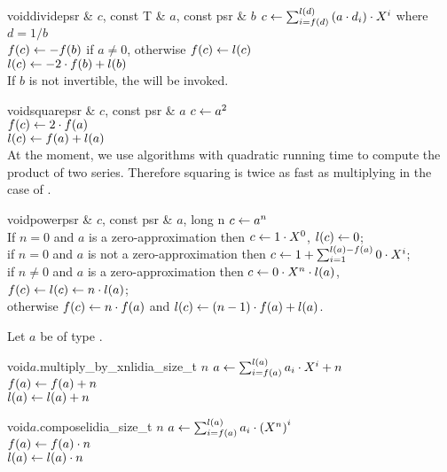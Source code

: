 \begin{fcode}{void}{divide}{psr & $c$, const T & $a$, const psr & $b$}
  $c \leftarrow \sum_{i=f(d)}^{l(d)} \left( a \cdot d_i \right) \cdot X^i$ where $d = 1/b $\\
  $f(c) \leftarrow - f(b)$ if $a \neq 0$, otherwise $f(c) \leftarrow l(c)$ \\
  $l(c) \leftarrow - 2 \cdot f(b) + l(b)$ \\
  If $b$ is not invertible, the \LEH will be invoked.
\end{fcode}

\begin{fcode}{void}{square}{psr & $c$, const psr & $a$}
  $c \leftarrow a^2$ \\
  $f(c) \leftarrow 2 \cdot f(a)$ \\
  $l(c) \leftarrow f(a) + l(a)$ \\
  At the moment, we use algorithms with quadratic running time to compute the product of two
  series.  Therefore squaring is twice as fast as multiplying in the case of
  .
\end{fcode}

\begin{fcode}{void}{power}{psr & $c$, const psr & $a$, long n}
  $c \leftarrow a^n$ \\
  If $n = 0$ and $a$ is a zero-approximation then
  $c \leftarrow 1 \cdot X^0$, $l(c) \leftarrow 0$; \\
  if $n = 0$ and $a$ is not a zero-approximation then
  $c \leftarrow 1 + \sum_{i=1}^{l(a)-f(a)} 0 \cdot X^i$; \\
  if $n \neq 0$ and $a$ is a zero-approximation then
  $c \leftarrow 0 \cdot X^n \cdot l(a)$, $f(c) \leftarrow l(c) \leftarrow n \cdot l(a)$; \\
  otherwise $f(c) \leftarrow n \cdot f(a)$ and $l(c) \leftarrow (n-1) \cdot f(a) + l(a)$.
\end{fcode}

Let $a$ be of type .

\begin{fcode}{void}{$a$.multiply_by_xn}{lidia_size_t $n$}
  $a \leftarrow \sum_{i=f(a)}^{l(a)} a_i \cdot X^i+n$ \\
  $f(a) \leftarrow f(a) + n$ \\
  $l(a) \leftarrow l(a) + n$
\end{fcode}

\begin{fcode}{void}{$a$.compose}{lidia_size_t $n$}
  $a \leftarrow \sum_{i=f(a)}^{l(a)} a_i \cdot \left(X^n\right)^i$ \\
  $f(a) \leftarrow f(a) \cdot n$ \\
  $l(a) \leftarrow l(a) \cdot n$
\end{fcode}


